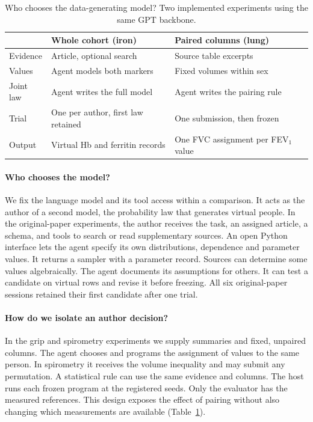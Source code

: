 \documentclass[sigconf,anonymous,review]{acmart}
\begin{document}
\begin{table}[tbp]
\caption{Who chooses the data-generating model? Two implemented experiments using the same GPT backbone.}
\label{tab:authority}
\small\centering
\begin{tabular}{@{}>{\raggedright\arraybackslash}p{}>{\raggedright\arraybackslash}p{}>{\raggedright\arraybackslash}p{}@{}}
\toprule
 & Whole cohort (iron) & Paired columns (lung)\\
\midrule
Evidence & Article, optional search & Source table excerpts\\
Values & Agent models both markers & Fixed volumes within sex\\
Joint law & Agent writes the full model & Agent writes the pairing rule\\
Trial & One per author, first law retained & One submission, then frozen\\
Output & Virtual Hb and ferritin records & One FVC assignment per FEV$_1$ value\\
\bottomrule
\end{tabular}
\end{table}

\paragraph{Who chooses the model?}
We fix the language model and its tool access within a comparison. It acts as the author of a second model, the probability law that generates virtual people. In the original-paper experiments, the author receives the task, an assigned article, a schema, and tools to search or read supplementary sources. An open Python interface lets the agent specify its own distributions, dependence and parameter values. It returns a sampler with a parameter record. Sources can determine some values algebraically. The agent documents its assumptions for others. It can test a candidate on virtual rows and revise it before freezing. All six original-paper sessions retained their first candidate after one trial.

\paragraph{How do we isolate an author decision?}
In the grip and spirometry experiments we supply summaries and fixed, unpaired columns. The agent chooses and programs the assignment of values to the same person. In spirometry it receives the volume inequality and may submit any permutation. A statistical rule can use the same evidence and columns. The host runs each frozen program at the registered seeds. Only the evaluator has the measured references. This design exposes the effect of pairing without also changing which measurements are available (Table~\ref{tab:authority}).
\end{document}
